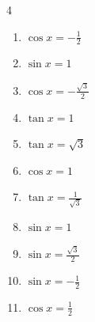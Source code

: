 \begin{multicols}{4}
\begin{enumerate}
  \item $\displaystyle \cos{x}  = -\frac{1}{2}$


  \item $\displaystyle \sin{x}  = 1$


  \item $\displaystyle \cos{x}  = -\frac{\sqrt{3}}{2}$


  \item $\displaystyle \tan{x}  = 1$


\columnbreak %

  \item $\displaystyle \tan{x}  = \sqrt{3}$


  \item $\displaystyle \cos{x}  = 1$

        \phantom{$\displaystyle x = 0$}

  \item $\displaystyle \tan{x}  = \frac{1}{\sqrt{3}}$


  \item $\displaystyle \sin{x}  = 1$


  \item $\displaystyle \sin{x}  = \frac{\sqrt{3}}{2}$


  \item $\displaystyle \sin{x}  = -\frac{1}{2}$


  \item $\displaystyle \cos{x}  = \frac{1}{2}$



\end{enumerate}
\end{multicols}
